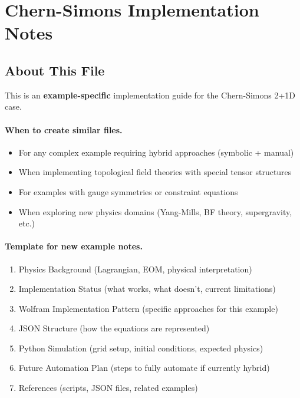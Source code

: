 
\section{Chern-Simons Implementation Notes}
\label{sec:chern-simons}

\subsection{About This File}

This is an \textbf{example-specific} implementation guide for the Chern-Simons 2+1D case.

\paragraph{When to create similar files.}
\label{par:cs-when-to-create}
\begin{itemize}
  \item For any complex example requiring hybrid approaches (symbolic + manual)
  \item When implementing topological field theories with special tensor structures
  \item For examples with gauge symmetries or constraint equations
  \item When exploring new physics domains (Yang-Mills, BF theory, supergravity, etc.)
\end{itemize}

\paragraph{Template for new example notes.}
\label{par:cs-template}
\begin{enumerate}
  \item Physics Background (Lagrangian, EOM, physical interpretation)
  \item Implementation Status (what works, what doesn't, current limitations)
  \item Wolfram Implementation Pattern (specific approaches for this example)
  \item JSON Structure (how the equations are represented)
  \item Python Simulation (grid setup, initial conditions, expected physics)
  \item Future Automation Plan (steps to fully automate if currently hybrid)
  \item References (scripts, JSON files, related examples)
\end{enumerate}


